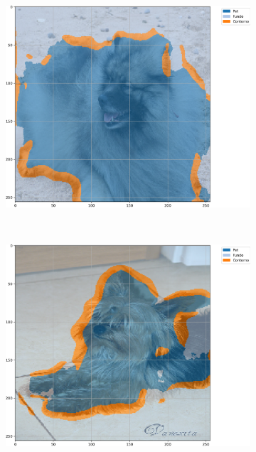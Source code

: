 \begin{figure}[H]
    \centering
    \caption{Exemplos segmentados a partir de U-Net com \textit{Max Pooling} e 500 épocas no conjunto de dados \textit{Oxford-IIIT Pets} baseada em acurácia.}
    \label{results:fig:semantic:4}
     \begin{subfigure}[t]{0.32\textwidth}
         \centering
         \includegraphics[width=1\linewidth]{recursos/imagens/results/max_acc_unet500_image_0_overlayed_segmentation.png}
         \label{results:fig:semantic:4.1}
     \end{subfigure}%
     ~ 
     \begin{subfigure}[t]{0.32\textwidth}
         \centering
         \includegraphics[width=1\linewidth]{recursos/imagens/results/max_acc_unet500_image_1_overlayed_segmentation.png}

\end{subfigure}
\end{figure}
